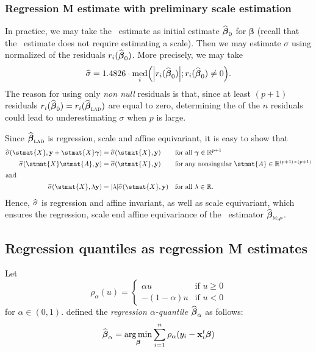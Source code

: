 \subsubsection{Regression M estimate with preliminary scale estimation}

In practice, we may take the ~estimate as initial estimate
$\widehat{\boldsymbol\beta}_0$ for $\boldsymbol\beta$ (recall that the
~estimate does not require estimating a scale). Then we may estimate
$\sigma$ using normalized  of the residuals
$r_i(\widehat{\boldsymbol\beta}_0)$. More precisely, we may take
\[
    \sthat{\sigma} = 1.4826 \cdot 
    \med_i\left(\left|r_i(\sthat{\boldsymbol\beta}_0)\right|; r_i(\sthat{\boldsymbol\beta}_0) \neq 0\right).
\]
The reason for using only \emph{non null} residuals is that, since at least
$(p+1)$ residuals $r_i(\sthat{\boldsymbol\beta}_0) =
r_i(\sthat{\boldsymbol\beta}_{\stsc{LAD}})$ are equal to zero, determining
the  of the $n$ residuals could lead to underestimating $\sigma$ when
$p$ is large.

Since $\sthat{\boldsymbol\beta}_{\stsc{LAD}}$ is regression, scale and
affine equivariant, it is easy to show that
%
\begin{align*}
    \sthat{\sigma}(\stmat{X}, \stvec{y} + \stmat{X}\boldsymbol\gamma)
        &= \sthat{\sigma}(\stmat{X}, \stvec{y})
        &&\text{for all $\boldsymbol\gamma \in \mathbb{R}^{p+1}$}
    \\
    \sthat{\sigma}(\stmat{X}\stmat{A}, \stvec{y})
        &= \sthat{\sigma}(\stmat{X}, \stvec{y})
        &&\text{for any nonsingular $\stmat{A} \in \mathbb{R}^{(p+1)\times(p+1)}$}
    \\
\intertext{and}
    \sthat{\sigma}(\stmat{X}, \lambda\stvec{y}) 
        &= |\lambda| \sthat{\sigma} (\stmat{X}, \stvec{y})
        &&\text{for all $\lambda\in\mathbb{R}$.}
\end{align*}
Hence, $\widehat{\sigma}$ is regression and affine invariant, as well as scale
equivariant, which ensures the regression, scale end affine equivariance of
the ~estimator $\sthat{\boldsymbol\beta}_{\stsc{M};\rho}$.


\subsection{Regression quantiles as regression M estimates}

Let
\[
    \rho_{\alpha}(u)=
    \begin{cases}
        \alpha u     & \text{if $u\geq0$}\\
        -(1-\alpha)u & \text{if $u<0$}
    \end{cases}
\]
for $\alpha \in (0,1)$. \citet{Koenker:1978} defined the \emph{regression $\alpha$-quantile} 
$\widehat{\boldsymbol\beta}_{\alpha}$ as follows:
%
\begin{equation}\label{eq:quantile_regr_min}
    \widehat{\boldsymbol\beta}_{\alpha} 
    = \mathop{\arg\min}_{\boldsymbol\beta} \sum_{i=1}^{n} \rho_{\alpha}(y_i-\mathbf x_i^t\boldsymbol\beta)
\end{equation}

